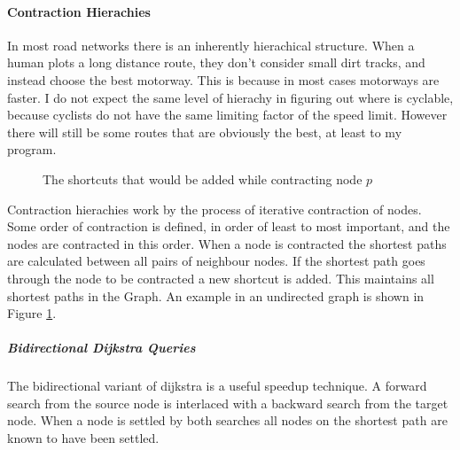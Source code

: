 \documentclass[11pt,twoside,a4paper]{article}
\begin{document}
\paragraph{Contraction Hierachies}
In most road networks there is an inherently hierachical structure. When a human plots a long distance route, they don't consider small dirt tracks, and instead choose the best motorway. 
This is because in most cases motorways are faster. I do not expect the same level of hierachy in figuring out where is cyclable, because cyclists do not have the same limiting factor of the speed limit. However there will still be 
some routes that are obviously the best, at least to my program.\\
\begin{figure}
    \begin{center}
\end{center}
    \caption{The shortcuts that would be added while contracting node $p$}
    \label{Contraction}
\end{figure}
Contraction hierachies work by the process of iterative contraction of nodes. Some order of contraction is defined, in order of least to most important, and the nodes are contracted in this order.
When a node is contracted the shortest paths are calculated between all pairs of neighbour nodes. If the shortest path goes through the node to be contracted a new shortcut is added. This maintains all shortest paths in the Graph. 
An example in an undirected graph is shown in Figure \ref{Contraction}. 
\subparagraph{Bidirectional Dijkstra Queries}
The bidirectional variant of dijkstra is a useful speedup technique. A forward search from the source node is interlaced with a backward search from the target node. When a node is settled by both searches all nodes on the shortest path are known to have been settled.
\end{document}
